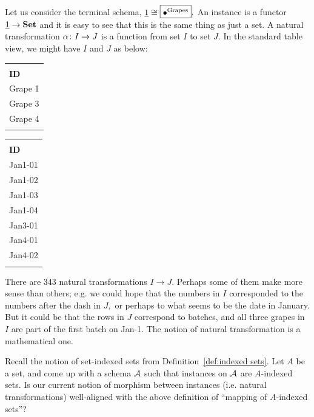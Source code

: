 \documentclass[CT4S-EN-RU]{subfiles}
\begin{document}
\begin{blockRUS}
\end{blockRUS}

\begin{exampleENG}\label{ex:nts on term}
Let us consider the terminal schema, $\underline{1}\cong\fbox{$\bullet^{\textnormal{Grapes}}$}.$ An instance is a functor $\underline{1}\rightarrow{\mathbf{Set}}$ and it is easy to see that this is the same thing as just a set. A natural transformation $\alpha\colon I\rightarrow J$ is a function from set $I$ to set $J.$ In the standard table view, we might have $I$ and $J$ as below:
\begin{center}
\begin{tabular}{| l ||}\bhline
\multicolumn{1}{| c |}{Grapes $(I)$}\\\bhline
{\bf ID}\\\bbhline
Grape 1\\\hline
Grape 3\\\hline
Grape 4\\\bhline
\end{tabular}
\hspace{1in}
\begin{tabular}{| l ||}\bhline
\multicolumn{1}{| c |}{Grapes $(J)$}\\\bhline
{\bf ID}\\\bbhline
Jan1-01\\\hline
Jan1-02\\\hline
Jan1-03\\\hline
Jan1-04\\\hline
Jan3-01\\\hline
Jan4-01\\\hline
Jan4-02\\\bhline
\end{tabular}
\end{center}

There are 343 natural transformations $I\to J.$ Perhaps some of them make more sense than others; e.g. we could hope that the numbers in $I$ corresponded to the numbers after the dash in $J,$ or perhaps to what seems to be the date in January. But it could be that the rows in $J$ correspond to batches, and all three grapes in $I$ are part of the first batch on Jan-1. The notion of natural transformation is a mathematical one.
\end{exampleENG}

\begin{exampleRUS}\label{ex:nts on term}
\end{exampleRUS}

\begin{exerciseENG}\label{exc:indexed sets as functors}
Recall the notion of set-indexed sets from Definition~\ref{def:indexed sets}. Let $A$ be a set, and come up with a schema $\mathcal{A}$ such that instances on $\mathcal{A}$ are $A$-indexed sets. Is our current notion of morphism between instances (i.e. natural transformations) well-aligned with the above definition of “mapping of $A$-indexed sets”?
\end{exerciseENG}
\end{document}
